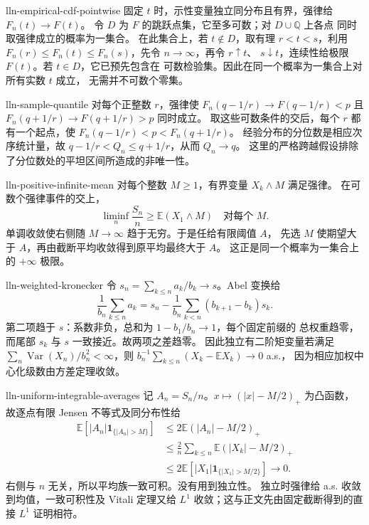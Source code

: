 \begin{solution}{lln-empirical-cdf-pointwise}
固定 $t$ 时，示性变量独立同分布且有界，强律给 $F_n(t)\to F(t)$。
令 $D$ 为 $F$ 的跳跃点集，它至多可数；对 $D\cup\mathbb Q$ 上各点
同时取强律成立的概率为一集合。
在此集合上，若 $t\notin D$，取有理 $r<t<s$，利用
$F_n(r)\le F_n(t)\le F_n(s)$，先令 $n\to\infty$，再令 $r\uparrow t$、
$s\downarrow t$，连续性给极限 $F(t)$。若 $t\in D$，它已预先包含在
可数检验集。因此在同一个概率为一集合上对所有实数 $t$ 成立，
无需并不可数个零集。
\end{solution}

\begin{solution}{lln-sample-quantile}
对每个正整数 $r$，强律使
$F_n(q-1/r)\to F(q-1/r)<p$ 且
$F_n(q+1/r)\to F(q+1/r)>p$ 同时成立。
取这些可数条件的交后，每个 $r$ 都有一个起点，使
$F_n(q-1/r)<p<F_n(q+1/r)$。
经验分布的分位数是相应次序统计量，故
$q-1/r<Q_n\le q+1/r$，从而 $Q_n\to q$。
这里的严格跨越假设排除了分位数处的平坦区间所造成的非唯一性。
\end{solution}

\begin{solution}{lln-positive-infinite-mean}
对每个整数 $M\ge1$，有界变量 $X_k\wedge M$ 满足强律。
在可数个强律事件的交上，
\[
 \liminf_n\frac{S_n}{n}\ge\mathbb E(X_1\wedge M)
 \quad\text{对每个 }M.
\]
单调收敛使右侧随 $M\to\infty$ 趋于无穷。于是任给有限阈值 $A$，
先选 $M$ 使期望大于 $A$，再由截断平均收敛得到原平均最终大于 $A$。
这正是同一个概率为一集合上的 $+\infty$ 极限。
\end{solution}

\begin{solution}{lln-weighted-kronecker}
令 $s_n=\sum_{k\le n}a_k/b_k\to s$。Abel 变换给
\[
 \frac1{b_n}\sum_{k\le n}a_k
 =s_n-\frac1{b_n}\sum_{k<n}(b_{k+1}-b_k)s_k.
\]
第二项趋于 $s$：系数非负，总和为 $1-b_1/b_n\to1$，每个固定前缀的
总权重趋零，而尾部 $s_k$ 与 $s$ 一致接近。故两项之差趋零。
因此独立有二阶矩变量若满足
$\sum_n\operatorname{Var}(X_n)/b_n^2<\infty$，则
$b_n^{-1}\sum_{k\le n}(X_k-\mathbb E X_k)\to0$ a.s.，
因为相应加权中心化级数由方差定理收敛。
\end{solution}

\begin{solution}{lln-uniform-integrable-averages}
记 $A_n=S_n/n$。$x\mapsto(|x|-M/2)_+$ 为凸函数，故逐点有限 Jensen
不等式及同分布性给
\begin{align*}
 \mathbb E[|A_n|\mathbf1_{\{|A_n|>M\}}]
 &\le2\mathbb E(|A_n|-M/2)_+\\
 &\le\frac2n\sum_{k\le n}\mathbb E(|X_k|-M/2)_+\\
 &\le2\mathbb E[|X_1|\mathbf1_{\{|X_1|>M/2\}}]\longrightarrow0.
\end{align*}
右侧与 $n$ 无关，所以平均族一致可积。没有用到独立性。
独立时强律给 a.s. 收敛到均值，一致可积性及 Vitali 定理又给 $L^1$
收敛；这与正文先由固定截断得到的直接 $L^1$ 证明相符。
\end{solution}

